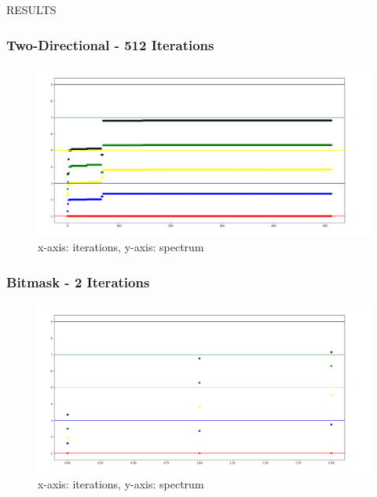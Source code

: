 \documentclass{beamer}
\begin{document}
\begin{frame}
\centering\Huge{\Huge{RESULTS}}
\end{frame}
\begin{frame}
\frametitle{Two-Directional - 512 Iterations}
    \begin{figure}
        \centering
        \includegraphics[width=1.1\textwidth,height=2\textheight,keepaspectratio]{Two_512.png}
        \caption{x-axis: iterations, y-axis: spectrum}
    \end{figure}
\end{frame}
\begin{frame}
\frametitle{Bitmask - 2 Iterations}
    \begin{figure}
        \centering
        \includegraphics[width=1.1\textwidth,height=2\textheight,keepaspectratio]{Bitmask_2.png}
        \caption{x-axis: iterations, y-axis: spectrum}
    \end{figure}
\end{frame}
\end{document}
